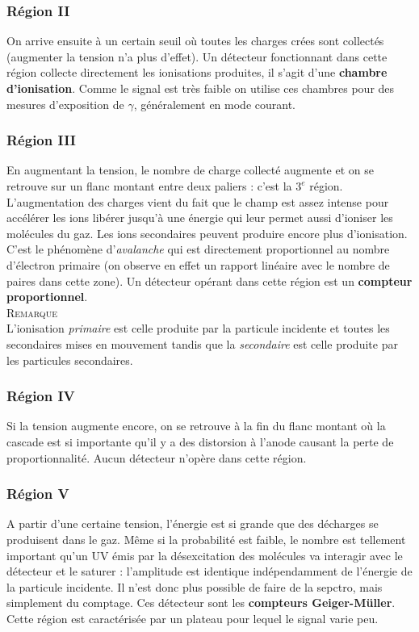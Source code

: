 	\subsubsection{Région II}
	On arrive ensuite à un certain seuil où toutes les charges crées sont collectés (augmenter la
	tension n'a plus d'effet). Un détecteur fonctionnant dans cette région collecte directement 
	les ionisations produites, il s'agit d'une \textbf{chambre d'ionisation}. Comme le signal est
	très faible on utilise ces chambres pour des mesures d'exposition de $\gamma$, généralement en
	mode courant.
	
	\subsubsection{Région III}
	En augmentant la tension, le nombre de charge collecté augmente et on se retrouve sur un flanc
	montant entre deux paliers : c'est la $3^e$ région. L'augmentation des charges vient du fait que
	le champ est assez intense pour accélérer les ions libérer jusqu'à une énergie qui leur permet
	aussi d'ioniser les molécules du gaz. Les ions secondaires peuvent produire encore plus 	
	d'ionisation. C'est le phénomène d'\textit{avalanche} qui est directement proportionnel au 
	nombre d'électron primaire (on observe en effet un rapport linéaire avec le nombre de paires
	dans cette zone). Un détecteur opérant dans cette région est un \textbf{compteur proportionnel}.\\
	
	\textsc{Remarque}\ \\
	L'ionisation \textit{primaire} est celle produite par la particule incidente et toutes les 
	secondaires mises en mouvement tandis que la \textit{secondaire} est celle produite par les
	particules secondaires.
	
	\subsubsection{Région IV}
	Si la tension augmente encore, on se retrouve à la fin du flanc montant où la cascade est si
	importante qu'il y a des distorsion à l'anode causant la perte de proportionnalité. Aucun 
	détecteur n'opère dans cette région.

	\subsubsection{Région V}
	A partir d'une certaine tension, l'énergie est si grande que des décharges se produisent dans 
	le gaz. Même si la probabilité est faible, le nombre est tellement important qu'un UV émis par 
	la désexcitation des molécules va interagir avec le détecteur et le saturer : l'amplitude 
	est identique indépendamment de l'énergie de la particule incidente. Il n'est donc plus possible
	de faire de la sepctro, mais simplement du comptage. Ces détecteur sont les \textbf{compteurs
	Geiger-Müller}. Cette région est caractérisée par un plateau pour lequel le signal varie peu.
	
